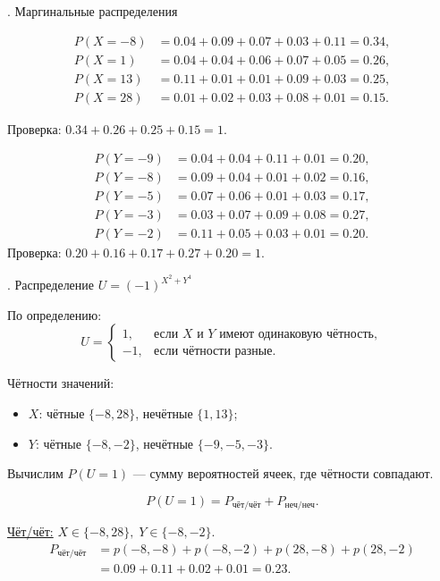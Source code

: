 \documentclass[a4paper,14pt]{extarticle}
\begin{document}
        . Маргинальные распределения
        
        \[
        \begin{aligned}
        P(X=-8) &= 0.04 + 0.09 + 0.07 + 0.03 + 0.11 = 0.34, \\
        P(X=1)  &= 0.04 + 0.04 + 0.06 + 0.07 + 0.05 = 0.26, \\
        P(X=13) &= 0.11 + 0.01 + 0.01 + 0.09 + 0.03 = 0.25, \\
        P(X=28) &= 0.01 + 0.02 + 0.03 + 0.08 + 0.01 = 0.15.
        \end{aligned}
        \]

        Проверка: $0.34 + 0.26 + 0.25 + 0.15 = 1.$

        \[
        \begin{aligned}
        P(Y=-9) &= 0.04 + 0.04 + 0.11 + 0.01 = 0.20, \\
        P(Y=-8) &= 0.09 + 0.04 + 0.01 + 0.02 = 0.16, \\
        P(Y=-5) &= 0.07 + 0.06 + 0.01 + 0.03 = 0.17, \\
        P(Y=-3) &= 0.03 + 0.07 + 0.09 + 0.08 = 0.27, \\
        P(Y=-2) &= 0.11 + 0.05 + 0.03 + 0.01 = 0.20.
        \end{aligned}
        \]
        Проверка: $0.20 + 0.16 + 0.17 + 0.27 + 0.20 = 1.$

        . Распределение $U = (-1)^{X^2 + Y^4}$

        По определению:
        \[
        U = 
        \begin{cases}
        1, & \text{если } X \text{ и } Y \text{ имеют одинаковую чётность},\\
        -1, & \text{если чётности разные.}
        \end{cases}
        \]

        Чётности значений:
        \begin{itemize}
            \item $X$: чётные $\{-8, 28\}$, нечётные $\{1, 13\}$;
            \item $Y$: чётные $\{-8, -2\}$, нечётные $\{-9, -5, -3\}$.
        \end{itemize}

        Вычислим $P(U=1)$ — сумму вероятностей ячеек, где чётности совпадают.

        \[
        P(U=1) = P_{\text{чёт/чёт}} + P_{\text{неч/неч}}.
        \]

        \noindent\underline{Чёт/чёт:} $X \in \{-8, 28\}, \; Y \in \{-8, -2\}$.
        \[
        \begin{aligned}
        P_{\text{чёт/чёт}} &= p(-8,-8) + p(-8,-2) + p(28,-8) + p(28,-2) \\
        &= 0.09 + 0.11 + 0.02 + 0.01 = 0.23.
        \end{aligned}
        \]
\end{document}
